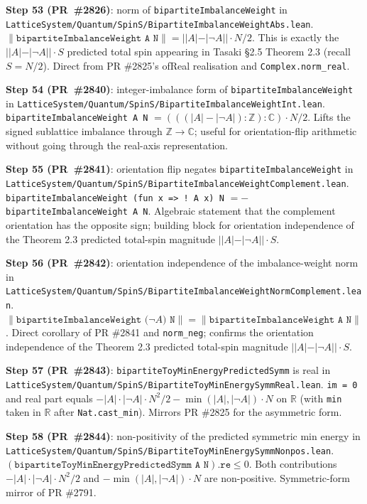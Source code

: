 \documentclass[a4paper,11pt]{article}
\begin{document}
\textbf{Step 53 (PR~\#2826)}: norm of
\texttt{bipartiteImbalanceWeight} in
\texttt{LatticeSystem/Quantum/SpinS/BipartiteImbalanceWeightAbs.lean}.
$\|\texttt{bipartiteImbalanceWeight A N}\| =
||A| - |\neg A|| \cdot N / 2$. This is exactly the
$||A| - |\neg A|| \cdot S$ predicted total spin appearing in
Tasaki §2.5 Theorem 2.3 (recall $S = N/2$). Direct from
PR \#2825's ofReal realisation and \texttt{Complex.norm\_real}.

\textbf{Step 54 (PR~\#2840)}: integer-imbalance form of
\texttt{bipartiteImbalanceWeight} in
\texttt{LatticeSystem/Quantum/SpinS/BipartiteImbalanceWeightInt.lean}.
\texttt{bipartiteImbalanceWeight A N} $=
(((|A| - |\neg A|) : \mathbb Z) : \mathbb C) \cdot N / 2$. Lifts
the signed sublattice imbalance through $\mathbb Z \to \mathbb C$;
useful for orientation-flip arithmetic without going through the
real-axis representation.

\textbf{Step 55 (PR~\#2841)}: orientation flip negates
\texttt{bipartiteImbalanceWeight} in
\texttt{LatticeSystem/Quantum/SpinS/BipartiteImbalanceWeightComplement.lean}.
\texttt{bipartiteImbalanceWeight (fun x => ! A x) N}
$= -$\texttt{bipartiteImbalanceWeight A N}. Algebraic statement
that the complement orientation has the opposite sign; building
block for orientation independence of the Theorem 2.3 predicted
total-spin magnitude $||A| - |\neg A|| \cdot S$.

\textbf{Step 56 (PR~\#2842)}: orientation independence of the
imbalance-weight norm in
\texttt{LatticeSystem/Quantum/SpinS/BipartiteImbalanceWeightNormComplement.lean}.
$\|\texttt{bipartiteImbalanceWeight (}\neg A\texttt{) N}\| =
\|\texttt{bipartiteImbalanceWeight A N}\|$. Direct corollary of
PR \#2841 and \texttt{norm\_neg}; confirms the orientation
independence of the Theorem 2.3 predicted total-spin magnitude
$||A| - |\neg A|| \cdot S$.

\textbf{Step 57 (PR~\#2843)}: \texttt{bipartiteToyMinEnergyPredictedSymm}
is real in
\texttt{LatticeSystem/Quantum/SpinS/BipartiteToyMinEnergySymmReal.lean}.
\texttt{im = 0} and real part equals $-|A| \cdot |\neg A| \cdot N^2 / 2
- \min(|A|, |\neg A|) \cdot N$ on $\mathbb R$ (with \texttt{min}
taken in $\mathbb R$ after \texttt{Nat.cast\_min}). Mirrors PR
\#2825 for the asymmetric form.

\textbf{Step 58 (PR~\#2844)}: non-positivity of the predicted
symmetric min energy in
\texttt{LatticeSystem/Quantum/SpinS/BipartiteToyMinEnergySymmNonpos.lean}.
$(\texttt{bipartiteToyMinEnergyPredictedSymm A N}).\texttt{re} \le 0$.
Both contributions $-|A| \cdot |\neg A| \cdot N^2 / 2$ and
$-\min(|A|, |\neg A|) \cdot N$ are non-positive. Symmetric-form
mirror of PR \#2791.
\end{document}
